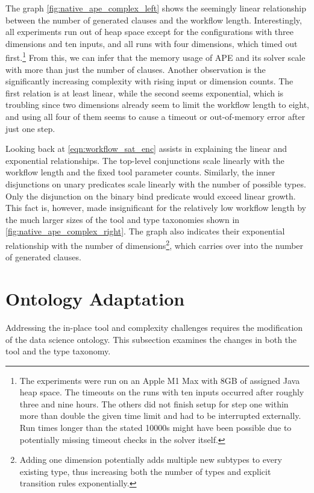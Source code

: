 The graph \autoref{fig:native_ape_complex_left} shows the seemingly linear relationship between the number of generated clauses and the workflow length. Interestingly, all experiments run out of heap space except for the configurations with three dimensions and ten inputs, and all runs with four dimensions, which timed out first.\footnote{The experiments were run on an Apple M1 Max with 8GB of assigned Java heap space. The timeouts on the runs with ten inputs occurred after roughly three and nine hours. The others did not finish setup for step one within more than double the given time limit and had to be interrupted externally. Run times longer than the stated 10000s might have been possible due to potentially missing timeout checks in the solver itself.} From this, we can infer that the memory usage of APE and its solver scale with more than just the number of clauses. Another observation is the significantly increasing complexity with rising input or dimension counts. The first relation is at least linear, while the second seems exponential, which is troubling since two dimensions already seem to limit the workflow length to eight, and using all four of them seems to cause a timeout or out-of-memory error after just one step.

Looking back at \autoref{eqn:workflow_sat_enc} assists in explaining the linear and exponential relationships. The top-level conjunctions scale linearly with the workflow length and the fixed tool parameter counts. Similarly, the inner disjunctions on unary predicates scale linearly with the number of possible types. Only the disjunction on the binary bind predicate would exceed linear growth. This fact is, however, made insignificant for the relatively low workflow length by the much larger sizes of the tool and type taxonomies shown in \autoref{fig:native_ape_complex_right}. The graph also indicates their exponential relationship with the number of dimensions\footnote{Adding one dimension potentially adds multiple new subtypes to every existing type, thus increasing both the number of types and explicit transition rules exponentially.}, which carries over into the number of generated clauses.

\section{Ontology Adaptation}
Addressing the in-place tool and complexity challenges requires the modification of the data science ontology. This subsection examines the changes in both the tool and the type taxonomy.


